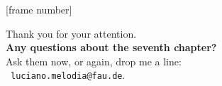\documentclass[aspectratio=169,t,xcolor=dvipsnames]{beamer}
\begin{document}
  { %
    [frame number]
    \begin{frame}[c]
      \begin{center}
        Thank you for your attention.\\
        {\bf Any questions about the seventh chapter?}\\[0.5cm]
        Ask them now, or again, drop me a line: \\
        \faSendO \ \texttt{luciano.melodia@fau.de}.
      \end{center}
    \end{frame}
  }
\end{document}

